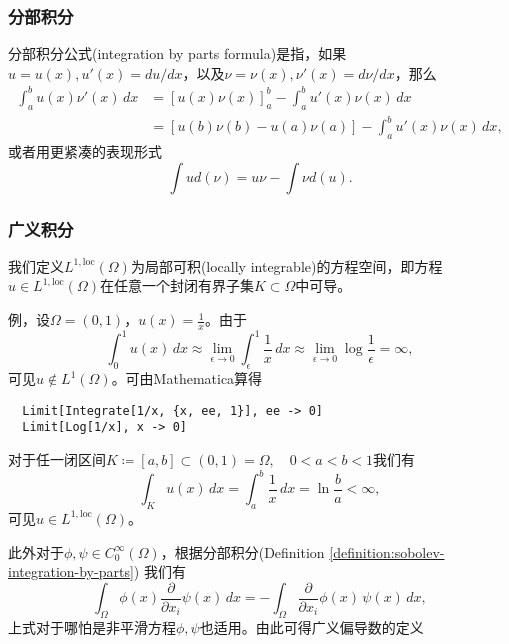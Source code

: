 \subsubsection{分部积分}
\begin{definition}[分部积分公式]
  \label{definition:sobolev-integration-by-parts}
  分部积分公式(integration by parts formula)是指，如果${u} = u(x), u'(x) = d u / d x$，以及$\nu = \nu(x), \nu'(x) = d \nu / d x$，那么
  \begin{equation*}
    \begin{split}
      \int_{a}^{b} u(x) \nu'(x) \, dx &= \left[ u(x) \nu(x) \right]_a^b - \int_a^b u'(x) \nu(x) \, dx \\
      &= \left[ u(b) \nu(b) - u(a) \nu(a) \right] - \int_a^b u'(x) \nu(x) \, dx,
  \end{split}
  \end{equation*}
  或者用更紧凑的表现形式
  \begin{equation*}
    \int u d(\nu) = u \nu - \int \nu d(u).
  \end{equation*}
\end{definition}

\subsubsection{广义积分}
\label{sec:generalized-integration}
我们定义$L^{1,\text{loc}}(\Omega)$为局部可积(locally integrable)的方程空间，即方程$u \in L^{1,\text{loc}}(\Omega)$在任意一个封闭有界子集$K \subset \Omega$中可导。

例，设$\Omega = (0,1)$，$u(x)=\frac{1}{x}$。由于
  \begin{equation*}
    \int_0^1 u(x) \, d x \approx \lim_{\epsilon \rightarrow 0} \int_{\epsilon}^1 \frac{1}{x} \, d x \approx \lim_{\epsilon \rightarrow 0} \log \frac{1}{\epsilon} = \infty,
  \end{equation*}
  可见$u \notin L^1(\Omega)$。可由Mathematica算得
  \begin{lstlisting}
  Limit[Integrate[1/x, {x, ee, 1}], ee -> 0]
  Limit[Log[1/x], x -> 0]
  \end{lstlisting}
对于任一闭区间$K \coloneqq [a,b] \subset (0,1) = \Omega, \quad 0 < a < b < 1$我们有
\begin{equation*}
  \int_{K} u(x)\, dx = \int_a^b \frac{1}{x} \, dx = \ln \frac{b}{a} < \infty,
\end{equation*}
可见$u \in L^{1, \text{loc}}(\Omega)$。

此外对于$\phi,\psi \in C_0^{\infty}(\Omega)$，根据分部积分(Definition \ref{definition:sobolev-integration-by-parts}) 我们有
\begin{equation*}
  \int_{\Omega} \phi(x) \frac{\partial}{\partial x_i} \psi(x) \, dx = - \int_{\Omega} \frac{\partial}{\partial x_i} \phi(x) \, \psi(x) \, d x,
\end{equation*}
上式对于哪怕是非平滑方程$\phi,\psi$也适用。由此可得广义偏导数的定义

